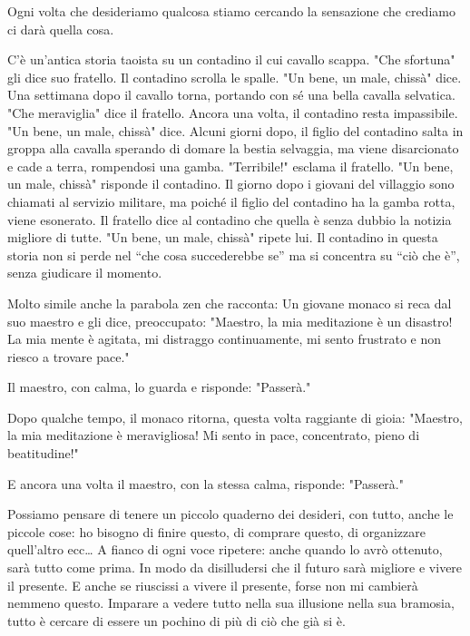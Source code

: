 \documentclass[12pt]{book} %
\begin{document}
\begin{mdframed}[linewidth=1pt]
Ogni volta che desideriamo qualcosa stiamo cercando la sensazione che crediamo ci darà quella cosa. 

C'è un'antica storia taoista su un contadino il cui cavallo scappa.
"Che sfortuna" gli dice suo fratello. Il contadino scrolla le spalle.
"Un bene, un male, chissà" dice. Una settimana dopo il cavallo torna,
portando con sé una bella cavalla selvatica. "Che meraviglia" dice il
fratello. Ancora una volta, il contadino resta impassibile. "Un bene, un male,
chissà" dice. Alcuni giorni dopo, il figlio del contadino salta in groppa alla cavalla sperando di
domare la bestia selvaggia, ma viene disarcionato e cade a terra, rompendosi una gamba.
"Terribile!" esclama il fratello. "Un bene, un male,
chissà" risponde il contadino. Il giorno dopo i giovani del villaggio sono chiamati al servizio
militare, ma poiché il figlio del contadino ha la gamba rotta, viene esonerato. Il fratello dice al contadino che
quella è senza dubbio la notizia migliore di tutte. "Un bene, un male,
chissà" ripete lui. Il contadino in questa storia non si perde nel “che cosa succederebbe se” ma
si concentra su “ciò che è”, senza giudicare il momento.

Molto simile anche la parabola zen che racconta:
Un giovane monaco si reca dal suo maestro e gli dice, preoccupato:
"Maestro, la mia meditazione è un disastro! La mia mente è agitata, mi distraggo continuamente, mi sento frustrato e non riesco a trovare pace."

Il maestro, con calma, lo guarda e risponde:
"Passerà."

Dopo qualche tempo, il monaco ritorna, questa volta raggiante di gioia:
"Maestro, la mia meditazione è meravigliosa! Mi sento in pace, concentrato, pieno di beatitudine!"

E ancora una volta il maestro, con la stessa calma, risponde:
"Passerà."

\bigskip
\bigskip

Possiamo pensare di tenere un piccolo quaderno dei desideri, con tutto, anche le piccole cose:
ho bisogno di finire questo, di comprare questo, di organizzare quell'altro ecc…
A fianco di ogni voce ripetere: anche quando lo avrò ottenuto, sarà tutto come prima.
In modo da disilludersi che il futuro sarà migliore e vivere il presente.
E anche se riuscissi a vivere il presente, forse non mi cambierà nemmeno questo.
Imparare a vedere tutto nella sua illusione nella sua bramosia, tutto è cercare di essere un pochino di più di ciò che già si è.


\end{mdframed}
\end{document}
